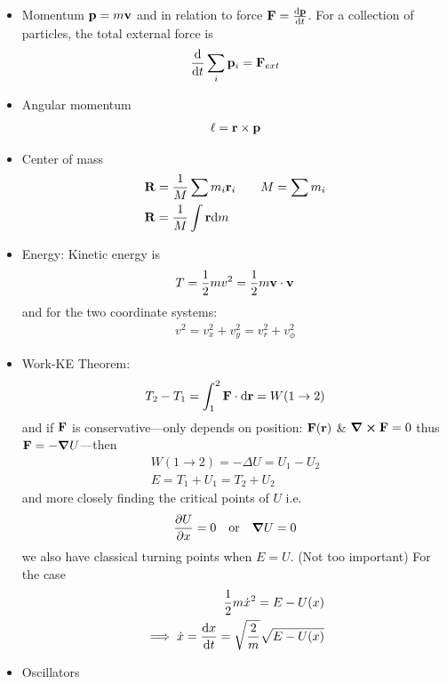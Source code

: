 \documentclass[../main.tex]{subfiles}
\begin{document}
\begin{itemize}
    \item Momentum $\vb p = m \vb v$ and in relation to force $\vb F = \dv{\vb p}{t}$. For a
    collection of particles, the total external force is
    \begin{align*}
        \dv{t} \sum_i \vb p_i = \vb F_{ext}
    \end{align*}
    \item Angular momentum
    \begin{align*}
        \vb \ell = \vb r \times \vb p
    \end{align*}
    \item Center of mass
    \begin{align*}
        \vb R &= \frac{1}{M} \sum m_i \vb r_i \qquad M = \sum m_i \\
        \vb R &= \frac{1}{M} \int \vb r \dd m
    \end{align*}
    \item Energy: Kinetic energy is
    \begin{align*}
        T = \frac{1}{2} mv^2 = \frac{1}{2} m \vb v \cdot \vb v
    \end{align*}
    and for the two coordinate systems:
    \begin{align*}
        v^2 = v_x^2 + v_y^2 = v_r^2 + v_\phi^2
    \end{align*}
    \item Work-KE Theorem: 
    \begin{align*}
        T_2 - T_1 = \int_1^2 \vb F \cdot \dd \vb r = W(1 \to 2)
    \end{align*}
    and if $\vb F$ is conservative---only depends on position: $\vb F(\vb r)$ \& $\curl \vb F = 0$
    thus $\vb F = -\grad U$---then
    \begin{align*}
        W(1 \to 2) = -\Delta U = U_1 - U_2 \\
        E = T_1 + U_1 = T_2 + U_2
    \end{align*} 
    and more closely finding the critical points of $U$ i.e.
    \begin{align*}
        \pdv{U}{x} = 0 \qor \grad{U} = 0
    \end{align*}
    we also have classical turning points when $E = U$. (Not too important) For the case
    \begin{align*}
        \frac{1}{2} m \dot x^2 = E - U(x) \\
        \implies \dot x = \dv{x}{t} = \sqrt{\frac{2}{m}} \sqrt{E - U(x)}
    \end{align*}
    \item Oscillators

\end{itemize}
\end{document}
